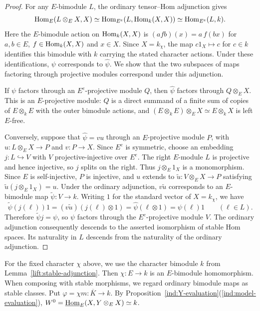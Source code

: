 \documentclass[11pt]{article}
\begin{document}
\begin{proof}
For any $E$-bimodule $L$, the ordinary tensor--Hom adjunction gives
\[
 {\rm Hom}_E(L\otimes_E X,X)
 \simeq{\rm Hom}_{E^e}(L,{\rm Hom}_k(X,X))
 \simeq{\rm Hom}_{E^e}(L,k).
\]
Here the $E$-bimodule action on ${\rm Hom}_k(X,X)$ is
$(afb)(x)=a\,f(bx)$ for $a,b\in E$, $f\in{\rm Hom}_k(X,X)$ and $x\in X$.
Since $X=k_\chi$, the map $c1_X\mapsto c$ for $c\in k$
identifies this bimodule with $k$ carrying the stated character actions.
Under these identifications, $\psi$ corresponds to $\widehat\psi$.
We show that the two subspaces of maps factoring through projective
modules correspond under this adjunction.

If $\psi$ factors through an $E^e$-projective module $Q$, then
$\widehat\psi$ factors through $Q\otimes_E X$.
This is an $E$-projective module: $Q$ is a direct summand of a finite
sum of copies of $E\otimes_k E$ with the outer bimodule actions,
and $(E\otimes_k E)\otimes_E X\simeq E\otimes_k X$ is left $E$-free.

Conversely, suppose that $\widehat\psi=vu$ through an
$E$-projective module $P$, with $u:L\otimes_E X\to P$ and
$v:P\to X$. Since $E^e$ is symmetric, choose an embedding
$j:L\hookrightarrow V$ with $V$ projective-injective over $E^e$.
The right $E$-module $L$ is projective and hence injective, so
$j$ splits on the right. Thus $j\otimes_E1_X$ is a monomorphism.
Since $E$ is self-injective, $P$ is injective, and $u$ extends to
$\widetilde u:V\otimes_E X\to P$ satisfying
$\widetilde u(j\otimes_E1_X)=u$.
Under the ordinary adjunction, $v\widetilde u$ corresponds to an
$E$-bimodule map $\widetilde\psi:V\to k$.
Writing $1$ for the standard vector of $X=k_\chi$, we have
\[
 \widetilde\psi(j(\ell))1
 =(v\widetilde u)(j(\ell)\otimes1)
 =\widehat\psi(\ell\otimes1)=\psi(\ell)1
 \qquad(\ell\in L).
\]
Therefore $\widetilde\psi j=\psi$, so $\psi$ factors through the
$E^e$-projective module $V$.
The ordinary adjunction consequently descends to the asserted
isomorphism of stable Hom spaces. Its naturality in $L$ descends
from the naturality of the ordinary adjunction.
\end{proof}

For the fixed character $\chi$ above, we use the character bimodule
$k$ from Lemma~\ref{lift:stable-adjunction}.
Then $\chi:E\to k$ is an $E$-bimodule homomorphism.
When composing with stable morphisms, we regard ordinary bimodule
maps as stable classes. Put
$\varphi=\chi m:\overline K\to k$.
By Proposition~\ref{ind:Y-evaluation}\textup{(\ref{ind:model-evaluation})},
$W^0=\underline{{\rm Hom}}_E(X,Y\otimes_E X)\simeq k$.
\end{document}
